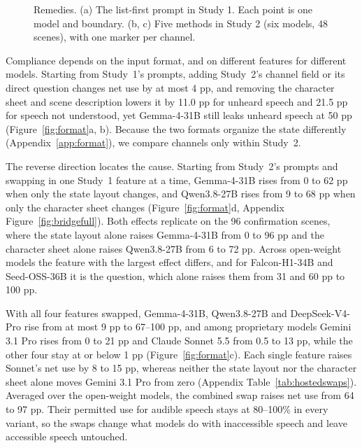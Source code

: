 \documentclass[11pt]{article}
\begin{document}
\begin{figure}[t]
\caption{Remedies. (a) The list-first prompt in Study 1. Each point is one model and boundary. (b, c) Five methods in Study 2 (six models, 48 scenes), with one marker per channel.}
\label{fig:remedy}
\end{figure}
Compliance depends on the input format, and on different features for different models. Starting from Study~1's prompts, adding Study~2's channel field or its direct question changes net use by at most 4 pp, and removing the character sheet and scene description lowers it by 11.0 pp for unheard speech and 21.5 pp for speech not understood, yet Gemma-4-31B still leaks unheard speech at 50 pp (Figure~\ref{fig:format}a, b). Because the two formats organize the state differently (Appendix~\ref{app:format}), we compare channels only within Study~2.

The reverse direction locates the cause. Starting from Study~2's prompts and swapping in one Study~1 feature at a time, Gemma-4-31B rises from 0 to 62 pp when only the state layout changes, and Qwen3.8-27B rises from 9 to 68 pp when only the character sheet changes (Figure~\ref{fig:format}d, Appendix Figure~\ref{fig:bridgefull}). Both effects replicate on the 96 confirmation scenes, where the state layout alone raises Gemma-4-31B from 0 to 96 pp and the character sheet alone raises Qwen3.8-27B from 6 to 72 pp. Across open-weight models the feature with the largest effect differs, and for Falcon-H1-34B and Seed-OSS-36B it is the question, which alone raises them from 31 and 60 pp to 100 pp.

With all four features swapped, Gemma-4-31B, Qwen3.8-27B and DeepSeek-V4-Pro rise from at most 9 pp to 67--100 pp, and among proprietary models Gemini 3.1 Pro rises from 0 to 21 pp and Claude Sonnet 5.5 from 0.5 to 13 pp, while the other four stay at or below 1 pp (Figure~\ref{fig:format}c). Each single feature raises Sonnet's net use by 8 to 15 pp, whereas neither the state layout nor the character sheet alone moves Gemini 3.1 Pro from zero (Appendix Table~\ref{tab:hostedswaps}). Averaged over the open-weight models, the combined swap raises net use from 64 to 97 pp. Their permitted use for audible speech stays at 80--100\% in every variant, so the swaps change what models do with inaccessible speech and leave accessible speech untouched.
\end{document}
